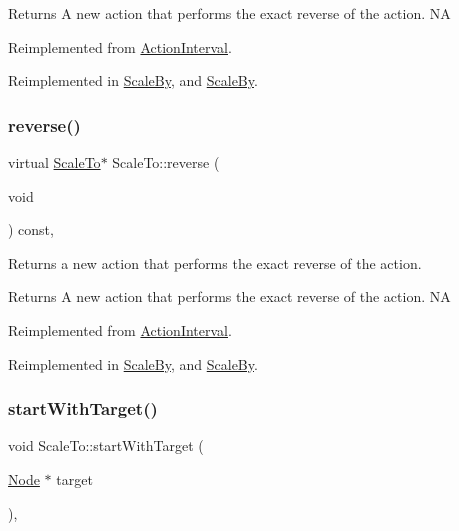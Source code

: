 \begin{DoxyReturn}{Returns}
A new action that performs the exact reverse of the action.  NA 
\end{DoxyReturn}


Reimplemented from \hyperlink{classActionInterval_a9f9ac7164036a0bc261a72f62a2b2da7}{Action\+Interval}.



Reimplemented in \hyperlink{classScaleBy_af4eaed672c6ed4991594d6404c49c521}{Scale\+By}, and \hyperlink{classScaleBy_a67a91333721ef688c63e20871e4d982b}{Scale\+By}.

\mbox{\label{classScaleTo_a78b1925960230dcae45724ceecf62b20}} 
\subsubsection{\texorpdfstring{reverse()}{reverse()}\hspace{0.1cm}{\footnotesize\ttfamily [2/2]}}
{\footnotesize\ttfamily virtual \hyperlink{classScaleTo}{Scale\+To}$\ast$ Scale\+To\+::reverse (\begin{DoxyParamCaption}\item[{void}]{ }\end{DoxyParamCaption}) const\hspace{0.3cm}{\ttfamily [override]}, {\ttfamily [virtual]}}

Returns a new action that performs the exact reverse of the action.

\begin{DoxyReturn}{Returns}
A new action that performs the exact reverse of the action.  NA 
\end{DoxyReturn}


Reimplemented from \hyperlink{classActionInterval_a9f9ac7164036a0bc261a72f62a2b2da7}{Action\+Interval}.



Reimplemented in \hyperlink{classScaleBy_af4eaed672c6ed4991594d6404c49c521}{Scale\+By}, and \hyperlink{classScaleBy_a67a91333721ef688c63e20871e4d982b}{Scale\+By}.

\mbox{\label{classScaleTo_a2591cf6fc3d966d7799bac46acce04d7}} 
\subsubsection{\texorpdfstring{start\+With\+Target()}{startWithTarget()}\hspace{0.1cm}{\footnotesize\ttfamily [1/2]}}
{\footnotesize\ttfamily void Scale\+To\+::start\+With\+Target (\begin{DoxyParamCaption}\item[{\hyperlink{classNode}{Node} $\ast$}]{target }\end{DoxyParamCaption})\hspace{0.3cm}{\ttfamily [override]}, {\ttfamily [virtual]}}

